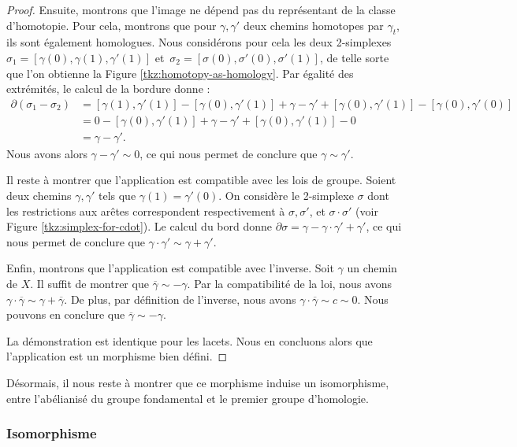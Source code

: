 \begin{proof}
Ensuite, montrons que l'image ne dépend pas du représentant de la classe d'homotopie. Pour cela, montrons que pour $\gamma,\gamma'$ deux chemins homotopes par $\gamma_t$, ils sont également homologues. Nous considérons pour cela les deux 2-simplexes $\sigma_1=[\gamma(0),\gamma(1),\gamma'(1)]$ et~$\sigma_2=[\sigma(0), \sigma'(0),\sigma'(1)]$, de telle sorte que l'on obtienne la Figure \ref{tkz:homotopy-as-homology}. Par égalité des extrémités, le calcul de la bordure donne : \[\begin{split}
\partial(\sigma_1-\sigma_2)&=[\gamma(1),\gamma'(1)]-[\gamma(0),\gamma'(1)]+\gamma-\gamma'+[\gamma(0),\gamma'(1)]-[\gamma(0),\gamma'(0)]\\
&=0-[\gamma(0),\gamma'(1)]+\gamma-\gamma'+[\gamma(0),\gamma'(1)]-0\\
&=\gamma-\gamma'.
\end{split}\]Nous avons alors $\gamma-\gamma'\sim 0$, ce qui nous permet de conclure que $\gamma\sim \gamma'$.

\bigskip Il reste à montrer que l'application est compatible avec les lois de groupe. Soient deux chemins $\gamma,\gamma'$ tels que $\gamma(1)=\gamma'(0)$. On considère le 2-simplexe $\sigma$ dont les restrictions aux arêtes correspondent respectivement à $\sigma,\sigma'$, et $\sigma\cdot \sigma'$ (voir Figure \ref{tkz:simplex-for-cdot}). Le calcul du bord donne $\partial \sigma=\gamma-\gamma\cdot\gamma'+\gamma'$, ce qui nous permet de conclure que $\gamma\cdot\gamma'\sim \gamma+\gamma'$.

Enfin, montrons que l'application est compatible avec l'inverse. Soit $\gamma$ un chemin de $X$. Il suffit de montrer que $\overline{\gamma}\sim -\gamma$. Par la compatibilité de la loi, nous avons $\gamma\cdot\overline{\gamma}\sim \gamma+\overline{\gamma}$. De plus, par définition de l'inverse, nous avons $\gamma\cdot\overline{\gamma}\sim c\sim 0$. Nous pouvons en conclure que $\overline{\gamma}\sim -\gamma$. 

\bigskip La démonstration est identique pour les lacets. Nous en concluons alors que l'application est un morphisme bien défini.
\end{proof}

Désormais, il nous reste à montrer que ce morphisme induise un isomorphisme, entre l'abélianisé du groupe fondamental et le premier groupe d'homologie.

\subsubsection{Isomorphisme}

